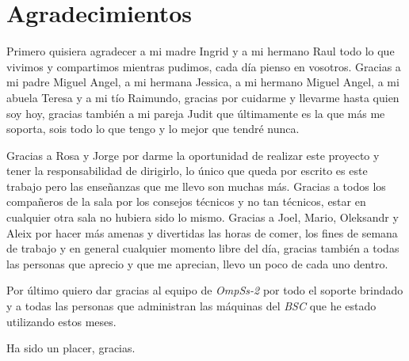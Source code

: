
\afterpage{\blankpage}
\newpage

\section*{Agradecimientos}

Primero quisiera agradecer a mi madre Ingrid y a mi hermano Raul todo lo que vivimos y compartimos mientras pudimos, cada día pienso en vosotros. Gracias a mi padre Miguel Angel, a mi hermana Jessica, a mi hermano Miguel Angel, a mi abuela Teresa y a mi tío Raimundo, gracias por cuidarme y llevarme hasta quien soy hoy, gracias también a mi pareja Judit que últimamente es la que más me soporta, sois todo lo que tengo y lo mejor que tendré nunca.
\par\bigskip
Gracias a Rosa y Jorge por darme la oportunidad de realizar este proyecto y tener la responsabilidad de dirigirlo, lo único que queda por escrito es este trabajo pero las enseñanzas que me llevo son muchas más. Gracias a todos los compañeros de la sala por los consejos técnicos y no tan técnicos, estar en cualquier otra sala no hubiera sido lo mismo. Gracias a Joel, Mario, Oleksandr y Aleix por hacer más amenas y divertidas las horas de comer, los fines de semana de trabajo y en general cualquier momento libre del día, gracias también a todas las personas que aprecio y que me aprecian, llevo un poco de cada uno dentro.
\par\bigskip
Por último quiero dar gracias al equipo de \textit{OmpSs-2} por todo el soporte brindado y a todas las personas que administran las máquinas del \textit{BSC} que he estado utilizando estos meses. 
\par \bigskip
Ha sido un placer, gracias.
